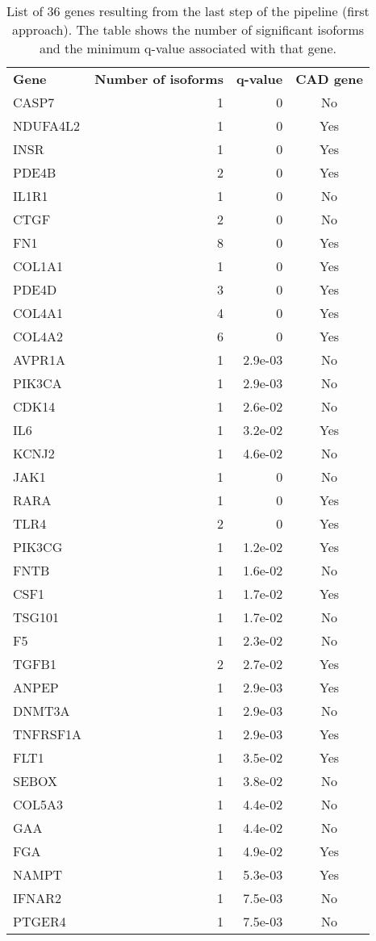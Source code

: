 \documentclass[fleqn,10pt]{SelfArx} %
\begin{document}
\begin{table}[!t]
	\centering
	\begin{tabularx}{\linewidth}{lRRc}
		\textbf{\color{white} Gene} & \textbf{\color{white} Number of isoforms} & \textbf{\color{white} q-value} & \textbf{\color{white}
			CAD gene}\\
	CASP7 &   1 & 0 & No \\ 
	NDUFA4L2 &   1 & 0 & Yes \\ 
	INSR &   1 & 0 & Yes \\ 
	PDE4B &   2 & 0 & Yes \\ 
	IL1R1 &   1 & 0 & No \\ 
	CTGF &   2 & 0 & No \\ 
	FN1 &   8 & 0 & Yes \\ 
	COL1A1 &   1 & 0 & Yes \\ 
	PDE4D &   3 & 0 & Yes \\ 
	COL4A1 &   4 & 0 & Yes \\ 
	COL4A2 &   6 & 0 & Yes \\ 
	AVPR1A &   1 & 2.9e-03 & No \\ 
	PIK3CA &   1 & 2.9e-03 & No \\ 
	CDK14 &   1 & 2.6e-02 & No \\ 
	IL6 &   1 & 3.2e-02 & Yes \\ 
	KCNJ2 &   1 & 4.6e-02 & No \\
	\hline 
	JAK1 &   1 & 0 & No \\ 
	RARA &   1 & 0 & Yes \\ 
	TLR4 &   2 & 0 & Yes \\ 
	PIK3CG &   1 & 1.2e-02 & Yes \\ 
	FNTB &   1 & 1.6e-02 & No \\ 
	CSF1 &   1 & 1.7e-02 & Yes \\ 
	TSG101 &   1 & 1.7e-02 & No \\ 
	F5 &   1 & 2.3e-02 & No \\ 
	TGFB1 &   2 & 2.7e-02 & Yes \\ 
	ANPEP &   1 & 2.9e-03 & Yes \\ 
	DNMT3A &   1 & 2.9e-03 & No \\ 
	TNFRSF1A &   1 & 2.9e-03 & Yes \\ 
	FLT1 &   1 & 3.5e-02 & Yes \\ 
	SEBOX &   1 & 3.8e-02 & No \\ 
	COL5A3 &   1 & 4.4e-02 & No \\ 
	GAA &   1 & 4.4e-02 & No \\ 
	FGA &   1 & 4.9e-02 & Yes \\ 
	NAMPT &   1 & 5.3e-03 & Yes \\ 
	IFNAR2 &   1 & 7.5e-03 & No \\ 
	PTGER4 &   1 & 7.5e-03 & No \\ 
	\end{tabularx}
	\smallskip
	\caption{List of 36 genes resulting from the last step of the pipeline (first approach). The table shows the number of significant isoforms and the minimum q-value associated with that gene.}
	\label{tab:sign36}
\end{table}
\end{document}
